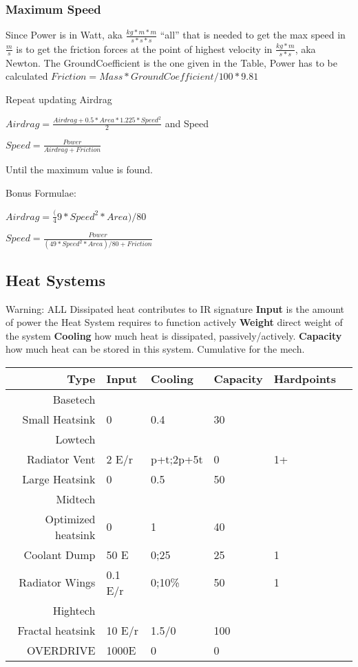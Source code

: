 \subsubsection{Maximum Speed}
Since Power is in Watt, aka
\(\frac{kg*m*m}{s*s*s}\)
``all'' that is needed to get the max speed in
\(\frac{m}{s}\) is to get
the friction forces at the point of highest velocity in \(\frac{kg*m}{s*s}\), aka Newton.
The GroundCoefficient is the one given in the Table, Power has to be calculated
\(Friction = Mass* GroundCoefficient/100 * 9.81\)\par
Repeat updating Airdrag\par
\(Airdrag = \frac{Airdrag + 0.5*Area*1.225 * Speed^2}{2}\)
and Speed\par
\(Speed = \frac{Power}{Airdrag + Friction}\)\par
Until the maximum value is found.\par
Bonus Formulae:\par
\(Airdrag = \frac(49*Speed^2*Area)/80 \) \par
\(Speed = \frac{Power}{(49*Speed^2*Area)/80 + Friction}\)


\subsection{Heat Systems}\label{subsec:heat-systems}
Warning: ALL Dissipated heat contributes to IR signature
\textbf{Input} is the amount of power the Heat System requires to function actively
\textbf{Weight} direct weight of the system
\textbf{Cooling} how much heat is dissipated, passively/actively.
\textbf{Capacity} how much heat can be stored in this system.
Cumulative for the mech.

\begin{tabular}{r|lllll}
    Type & Input & Cooling & Capacity & Hardpoints\\
    \hline Basetech\\
    Small Heatsink & 0 & 0.4 & 30 & \\
    \hline Lowtech\\
    Radiator Vent & 2 E/r & p+t;2p+5t & 0 & 1+\\
    Large Heatsink & 0 & 0.5 & 50 & \\
    \hline Midtech\\
    Optimized heatsink  & 0 & 1 & 40 & \\
    Coolant Dump  & 50 E & 0;25 & 25 & 1 \\
    Radiator Wings & 0.1 E/r & 0;10\% & 50 & 1\\
    \hline Hightech\\
    Fractal heatsink & 10 E/r & 1.5/0 & 100 & \\
    OVERDRIVE & 1000E & 0 &  0 &
\end{tabular}

